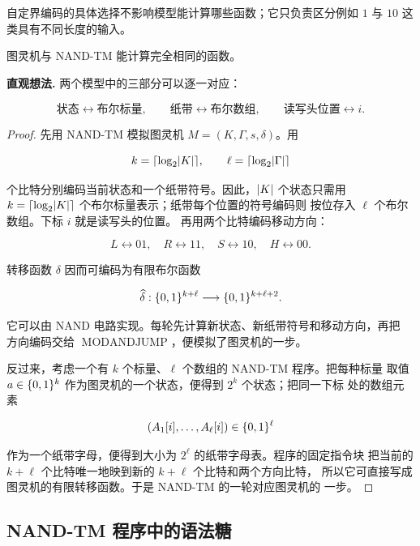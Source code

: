 自定界编码的具体选择不影响模型能计算哪些函数；它只负责区分例如 $1$ 与
$10$ 这类具有不同长度的输入。

\begin{theorem}
  \label{thm:tm-nand-tm-equivalence}
  图灵机与 NAND-TM 能计算完全相同的函数。
\end{theorem}

\textbf{直观想法.}
两个模型中的三部分可以逐一对应：

\[
  \text{状态}\longleftrightarrow\text{布尔标量},\qquad
  \text{纸带}\longleftrightarrow\text{布尔数组},\qquad
  \text{读写头位置}\longleftrightarrow i.
\]

\begin{proof}
  先用 NAND-TM 模拟图灵机 $M=(K,\Gamma,s,\delta)$。用

  \[
    k=\lceil\log_2\lvert K\rvert\rceil,
    \qquad
    \ell=\lceil\log_2\lvert \Gamma\rvert\rceil
  \]

  个比特分别编码当前状态和一个纸带符号。因此，$\lvert K\rvert$ 个状态只需用
  $k=\lceil\log_2\lvert K\rvert\rceil$ 个布尔标量表示；纸带每个位置的符号编码则
  按位存入 $\ell$ 个布尔数组。下标 $i$ 就是读写头的位置。
  再用两个比特编码移动方向：

  \[
    L\leftrightarrow 01,
    \quad R\leftrightarrow 11,
    \quad S\leftrightarrow 10,
    \quad H\leftrightarrow 00.
  \]

  转移函数 $\delta$ 因而可编码为有限布尔函数

  \[
    \widehat\delta:\{0,1\}^{k+\ell}\longrightarrow
    \{0,1\}^{k+\ell+2}.
  \]

  它可以由 NAND 电路实现。每轮先计算新状态、新纸带符号和移动方向，再把
  方向编码交给 $\operatorname{MODANDJUMP}$，便模拟了图灵机的一步。

  反过来，考虑一个有 $k$ 个标量、$\ell$ 个数组的 NAND-TM 程序。把每种标量
  取值 $a\in\{0,1\}^k$ 作为图灵机的一个状态，便得到 $2^k$ 个状态；把同一下标
  处的数组元素

  \[
    (A_1[i],\ldots,A_\ell[i])\in\{0,1\}^\ell
  \]

  作为一个纸带字母，便得到大小为 $2^\ell$ 的纸带字母表。程序的固定指令块
  把当前的 $k+\ell$ 个比特唯一地映到新的 $k+\ell$ 个比特和两个方向比特，
  所以它可直接写成图灵机的有限转移函数。于是 NAND-TM 的一轮对应图灵机的
  一步。
\end{proof}

\subsection{NAND-TM 程序中的语法糖}

